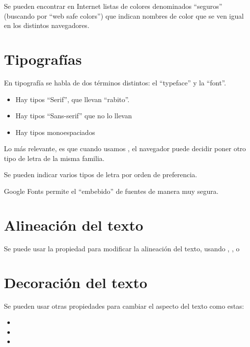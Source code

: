 \documentclass[letterpaper,10pt,spanish]{sphinxmanual}
\begin{document}
Se pueden encontrar en Internet listas de colores denominados ``seguros'' (buscando por ``web safe colors'') que indican nombres de color que se ven igual en los distintos navegadores.


\section{Tipografías}
\label{tema3:tipografias}
En tipografía se habla de dos términos distintos: el ``typeface'' y la ``font''.
\begin{itemize}
\item {} 
Hay tipos ``Serif'', que llevan ``rabito''.

\item {} 
Hay tipos ``Sans-serif'' que no lo llevan

\item {} 
Hay tipos monoespaciados

\end{itemize}

Lo más relevante, es que cuando usamos , el navegador puede decidir poner otro tipo de letra de la misma familia.

Se pueden indicar varios tipos de letra por orden de preferencia.

Google Fonts permite el ``embebido'' de fuentes de manera muy segura.


\section{Alineación del texto}
\label{tema3:alineacion-del-texto}
Se puede usar la propiedad  para modificar la alineación del texto, usando , ,  o 


\section{Decoración del texto}
\label{tema3:decoracion-del-texto}
Se pueden usar otras propiedades para cambiar
el aspecto del texto como estas:
\begin{itemize}
\item {} 

\item {} 

\item {} 

\end{itemize}
\end{document}
